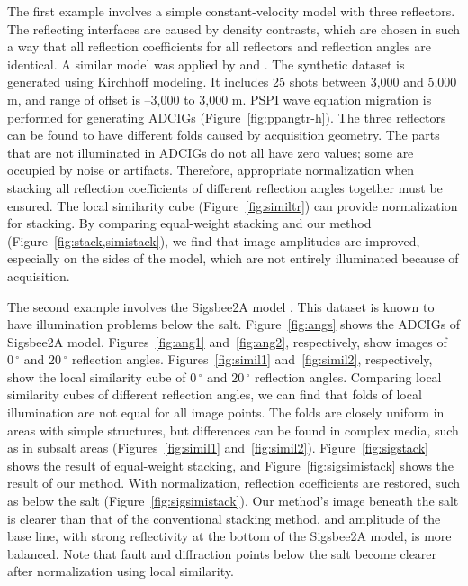 The first example involves a simple constant-velocity model with three reflectors. The reflecting interfaces are caused by density contrasts, which are chosen in such a way that all reflection coefficients for all reflectors and reflection angles are identical. A similar model was applied by \cite{Zhang2003} and \cite{Schleicher}. The synthetic dataset is generated using Kirchhoff modeling. It includes 25 shots between 3,000 and 5,000 m, and range of offset is –3,000 to 3,000 m. PSPI wave equation migration is performed for generating ADCIGs (Figure~\ref{fig:ppangtr-h}). The three reflectors can be found to have different folds caused by acquisition geometry. The parts that are not illuminated in ADCIGs do not all have zero values; some are occupied by noise or artifacts. Therefore, appropriate normalization when stacking all reflection coefficients of different reflection angles together must be ensured. The local similarity cube (Figure~\ref{fig:similtr}) can provide normalization for stacking. By comparing equal-weight stacking and our method (Figure~\ref{fig:stack,simistack}), we find that image amplitudes are improved, especially on the sides of the model, which are not entirely illuminated because of acquisition.


The second example involves the Sigsbee2A model \cite[]{Paffenholz}. This dataset is known to have illumination problems below the salt. Figure~\ref{fig:angs} shows the ADCIGs of Sigsbee2A model. Figures~\ref{fig:ang1} and~\ref{fig:ang2}, respectively, show images of $0\,^{\circ}$ and $20\,^{\circ}$  reflection angles. Figures~\ref{fig:simil1} and~\ref{fig:simil2}, respectively, show the local similarity cube of $0\,^{\circ}$ and $20\,^{\circ}$ reflection angles. Comparing local similarity cubes of different reflection angles, we can find that folds of local illumination are not equal for all image points. The folds are closely uniform in areas with simple structures, but differences can be found in complex media, such as in subsalt areas (Figures~\ref{fig:simil1} and~\ref{fig:simil2}). Figure~\ref{fig:sigstack} shows the result of equal-weight stacking, and Figure~\ref{fig:sigsimistack} shows the result of our method. With normalization, reflection coefficients are restored, such as below the salt (Figure~\ref{fig:sigsimistack}). Our method’s image beneath the salt is clearer than that of the conventional stacking method, and amplitude of the base line, with strong reflectivity at the bottom of the Sigsbee2A model, is more balanced. Note that fault and diffraction points below the salt become clearer after normalization using local similarity.

